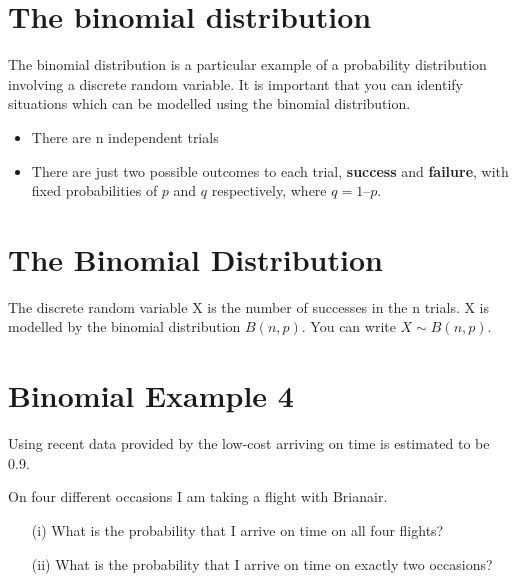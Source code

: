 \documentclass{article}
\begin{document}

\section{The binomial distribution} 


The binomial distribution is a particular example of a probability distribution involving a discrete random variable. 
It is important that you can identify situations which can be modelled using the binomial distribution. 

\begin{itemize}
\item There are n independent trials 
\item There are just two possible outcomes to each trial, \textbf{success} and \textbf{failure}, with fixed probabilities of $p$ and $q$ respectively, where $q = 1 – p$. 
\end{itemize}
\section{The Binomial Distribution}
The discrete random variable X is the number of successes in the n trials. 
X is modelled by the binomial distribution $B(n, p)$. 
You can write $X \sim B(n, p)$.

\section{Binomial Example 4} 
Using recent data provided by the low-cost arriving on time is estimated to be 0.9. 

On four different occasions I am taking a flight with Brianair. 
\begin{itemize}
\item[(i)] What is the probability that I arrive on time on all four flights? 
\item[(ii)] What is the probability that I arrive on time on exactly two occasions? 
\end{itemize}

\end{document}
